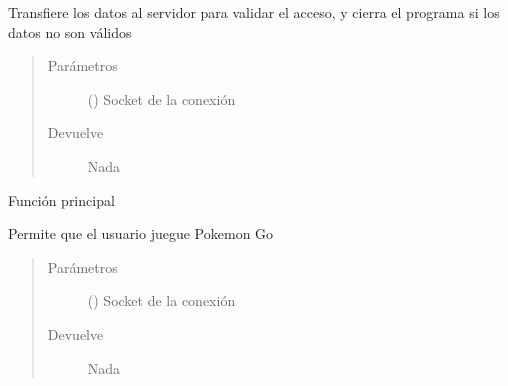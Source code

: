 \documentclass[letterpaper,10pt,spanish,openany,oneside]{sphinxmanual}
\begin{document}
\begin{fulllineitems}
\label{\detokenize{client:client.login}}
Transfiere los datos al servidor para validar el acceso, y cierra el programa si los datos no son válidos
\begin{quote}\begin{description}
\item[{Parámetros}] \leavevmode
{} () \textendash{} Socket de la conexión

\item[{Devuelve}] \leavevmode
Nada

\end{description}\end{quote}

\end{fulllineitems}


\begin{fulllineitems}
\label{\detokenize{client:client.main}}
Función principal

\end{fulllineitems}


\begin{fulllineitems}
\label{\detokenize{client:client.playPokemon}}
Permite que el usuario juegue Pokemon Go
\begin{quote}\begin{description}
\item[{Parámetros}] \leavevmode
{} () \textendash{} Socket de la conexión

\item[{Devuelve}] \leavevmode
Nada

\end{description}\end{quote}

\end{fulllineitems}
\end{document}
